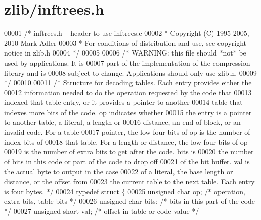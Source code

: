 \hypertarget{zlib_2inftrees_8h_source}{}\section{zlib/inftrees.h}
\label{zlib_2inftrees_8h_source}

\begin{DoxyCode}
00001 \textcolor{comment}{/* inftrees.h -- header to use inftrees.c}
00002 \textcolor{comment}{ * Copyright (C) 1995-2005, 2010 Mark Adler}
00003 \textcolor{comment}{ * For conditions of distribution and use, see copyright notice in zlib.h}
00004 \textcolor{comment}{ */}
00005 
00006 \textcolor{comment}{/* WARNING: this file should *not* be used by applications. It is}
00007 \textcolor{comment}{   part of the implementation of the compression library and is}
00008 \textcolor{comment}{   subject to change. Applications should only use zlib.h.}
00009 \textcolor{comment}{ */}
00010 
00011 \textcolor{comment}{/* Structure for decoding tables.  Each entry provides either the}
00012 \textcolor{comment}{   information needed to do the operation requested by the code that}
00013 \textcolor{comment}{   indexed that table entry, or it provides a pointer to another}
00014 \textcolor{comment}{   table that indexes more bits of the code.  op indicates whether}
00015 \textcolor{comment}{   the entry is a pointer to another table, a literal, a length or}
00016 \textcolor{comment}{   distance, an end-of-block, or an invalid code.  For a table}
00017 \textcolor{comment}{   pointer, the low four bits of op is the number of index bits of}
00018 \textcolor{comment}{   that table.  For a length or distance, the low four bits of op}
00019 \textcolor{comment}{   is the number of extra bits to get after the code.  bits is}
00020 \textcolor{comment}{   the number of bits in this code or part of the code to drop off}
00021 \textcolor{comment}{   of the bit buffer.  val is the actual byte to output in the case}
00022 \textcolor{comment}{   of a literal, the base length or distance, or the offset from}
00023 \textcolor{comment}{   the current table to the next table.  Each entry is four bytes. */}
00024 \textcolor{keyword}{typedef} \textcolor{keyword}{struct }\{
00025     \textcolor{keywordtype}{unsigned} \textcolor{keywordtype}{char} op;           \textcolor{comment}{/* operation, extra bits, table bits */}
00026     \textcolor{keywordtype}{unsigned} \textcolor{keywordtype}{char} bits;         \textcolor{comment}{/* bits in this part of the code */}
00027     \textcolor{keywordtype}{unsigned} \textcolor{keywordtype}{short} val;         \textcolor{comment}{/* offset in table or code value */}

\end{DoxyCode}
